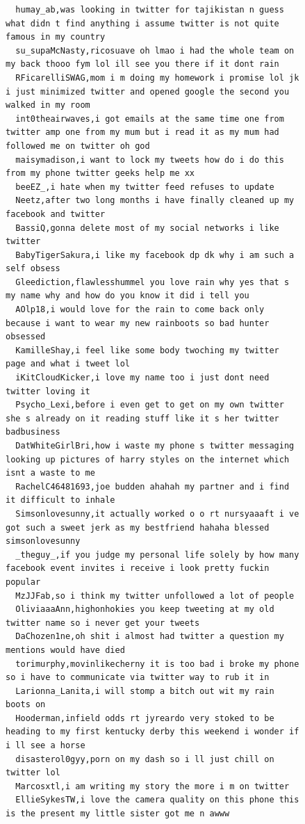 \begin{figure}[htpb]
\begin{verbatim}
  humay_ab,was looking in twitter for tajikistan n guess what didn t find anything i assume twitter is not quite famous in my country
  su_supaMcNasty,ricosuave oh lmao i had the whole team on my back thooo fym lol ill see you there if it dont rain
  RFicarelliSWAG,mom i m doing my homework i promise lol jk i just minimized twitter and opened google the second you walked in my room
  int0theairwaves,i got emails at the same time one from twitter amp one from my mum but i read it as my mum had followed me on twitter oh god
  maisymadison,i want to lock my tweets how do i do this from my phone twitter geeks help me xx
  beeEZ_,i hate when my twitter feed refuses to update
  Neetz,after two long months i have finally cleaned up my facebook and twitter
  BassiQ,gonna delete most of my social networks i like twitter
  BabyTigerSakura,i like my facebook dp dk why i am such a self obsess
  Gleediction,flawlesshummel you love rain why yes that s my name why and how do you know it did i tell you
  AOlp18,i would love for the rain to come back only because i want to wear my new rainboots so bad hunter obsessed
  KamilleShay,i feel like some body twoching my twitter page and what i tweet lol
  iKitCloudKicker,i love my name too i just dont need twitter loving it
  Psycho_Lexi,before i even get to get on my own twitter she s already on it reading stuff like it s her twitter badbusiness
  DatWhiteGirlBri,how i waste my phone s twitter messaging looking up pictures of harry styles on the internet which isnt a waste to me
  RachelC46481693,joe budden ahahah my partner and i find it difficult to inhale
  Simsonlovesunny,it actually worked o o rt nursyaaaft i ve got such a sweet jerk as my bestfriend hahaha blessed simsonlovesunny
  _theguy_,if you judge my personal life solely by how many facebook event invites i receive i look pretty fuckin popular
  MzJJFab,so i think my twitter unfollowed a lot of people
  OliviaaaAnn,highonhokies you keep tweeting at my old twitter name so i never get your tweets
  DaChozen1ne,oh shit i almost had twitter a question my mentions would have died
  torimurphy,movinlikecherny it is too bad i broke my phone so i have to communicate via twitter way to rub it in
  Larionna_Lanita,i will stomp a bitch out wit my rain boots on
  Hooderman,infield odds rt jyreardo very stoked to be heading to my first kentucky derby this weekend i wonder if i ll see a horse
  disasterol0gyy,porn on my dash so i ll just chill on twitter lol
  Marcosxtl,i am writing my story the more i m on twitter
  EllieSykesTW,i love the camera quality on this phone this is the present my little sister got me n awww

\end{verbatim}
\end{figure}
